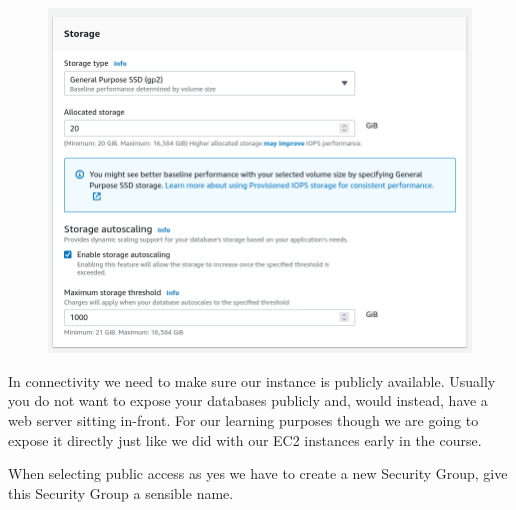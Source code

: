 \documentclass{csse4400}
\begin{document}
\begin{figure}[H]
  \includegraphics[width=\textwidth]{images/db5}
\end{figure}

In connectivity we need to make sure our instance is publicly available. Usually you do not want to expose your databases publicly and, would instead, have a web server sitting in-front. For our learning purposes though we are going to expose it directly just like we did with our EC2 instances early in the course.

When selecting public access as yes we have to create a new Security Group,
give this Security Group a sensible name.
\end{document}
